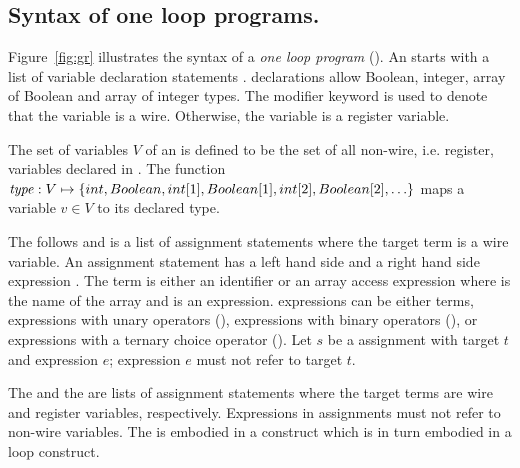 \subsection{Syntax of one loop programs.}
%

Figure~\ref{fig:gr} illustrates the syntax of a 
{\em one loop program} (\caig).
An \caig starts with 
a list of variable declaration statements . 
\caig declarations allow Boolean, integer, array of Boolean 
and array of integer types.
The  modifier keyword is used to denote that 
the variable is a wire. 
Otherwise, the variable is a register variable. 



\begin{definition}
The set of \caig variables $V$ of an \caig is defined to be 
the set 
of all non-wire, i.e. register,  variables declared in .
The function $\mathit{type}: V \mapsto \{ int, Boolean, int[1], Boolean[1], int[2], Boolean[2], \ldots \}$ maps a variable
$v \in V$ to its declared type. 
\end{definition}



The  follows  and is a list 
of assignment statements where the target term is a wire 
variable. 
An assignment statement has a left hand side  and 
a right hand side expression . 
The term is either an identifier  or an array 
access expression  where  is the name
of the array and  is an expression. 
\caig expressions can be either terms, expressions with unary
operators (\cci{-,!}), expressions with binary operators (\cci{+,-,*,/,<,>,<=,>=,==,\&\&,||}), 
or expressions with a ternary choice operator 
(). 
Let $s$ be a  assignment with target $t$ and 
expression $e$; expression $e$ must not refer to target $t$. 



The  and the  are lists 
of assignment statements where the target terms are wire and
register variables, respectively. 
Expressions in  assignments 
must not refer to non-wire
variables. 
The  is embodied in a  construct
which is in turn embodied in a  loop construct. 



